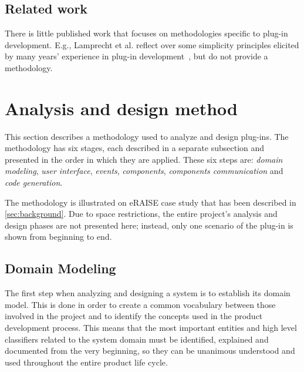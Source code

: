 \documentclass[conference]{IEEEtran}
\begin{document}
%
\subsection{Related work}
\label{sec:related-work}

There is little published work that focuses on methodologies specific
to plug-in development.  E.g., Lamprecht et al. reflect over some
simplicity principles elicited by many years' experience in plug-in
development~\cite{6229816}, but do not provide a methodology.


\section{Analysis and design method}
\label{sec:analys-design-meth}

This section describes a methodology used to analyze and design
plug-ins. The methodology has six stages, each described in a separate
subsection and presented in the order in which they are applied. These
six steps are: \emph{domain modeling}, \emph{user interface},
\emph{events}, \emph{components}, \emph{components communication} and
\emph{code generation}.

The methodology is illustrated on eRAISE case study that has been
described in \autoref{sec:background}. Due to space restrictions, the
entire project's analysis and design phases are not presented here;
instead, only one scenario of the plug-in is shown from beginning to
end.

%
\subsection{Domain Modeling}
\label{sec:domain-modeling}

The first step when analyzing and designing a system is to establish
its domain model. This is done in order to create a common vocabulary
between those involved in the project and to identify the concepts
used in the product development process. This means that the most
important entities and high level classifiers related to the system domain must
be identified, explained and documented from the very beginning, so they
can be unanimous understood and used throughout the entire product
life cycle.
\end{document}
